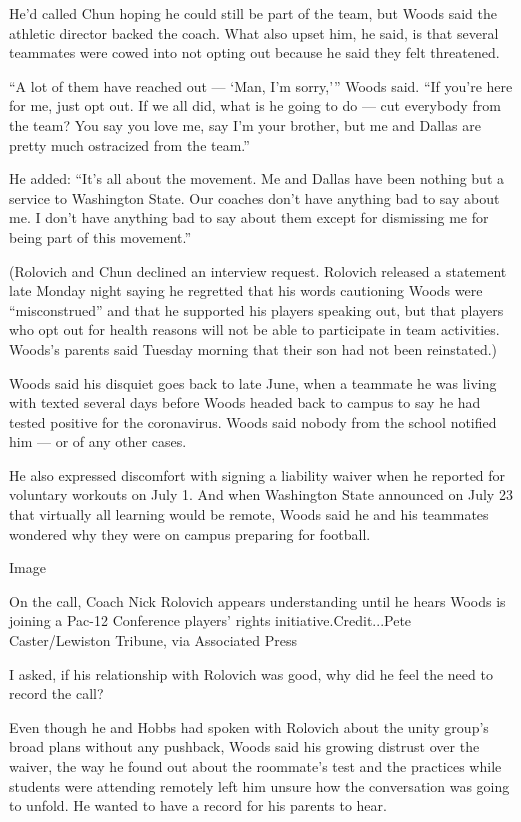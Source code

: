 He'd called Chun hoping he could still be part of the team, but Woods
said the athletic director backed the coach. What also upset him, he
said, is that several teammates were cowed into not opting out because
he said they felt threatened.

``A lot of them have reached out --- `Man, I'm sorry,''' Woods said.
``If you're here for me, just opt out. If we all did, what is he going
to do --- cut everybody from the team? You say you love me, say I'm your
brother, but me and Dallas are pretty much ostracized from the team.''

He added: ``It's all about the movement. Me and Dallas have been nothing
but a service to Washington State. Our coaches don't have anything bad
to say about me. I don't have anything bad to say about them except for
dismissing me for being part of this movement.''

(Rolovich and Chun declined an interview request. Rolovich released a
statement late Monday night saying he regretted that his words
cautioning Woods were ``misconstrued'' and that he supported his players
speaking out, but that players who opt out for health reasons will not
be able to participate in team activities. Woods's parents said Tuesday
morning that their son had not been reinstated.)

Woods said his disquiet goes back to late June, when a teammate he was
living with texted several days before Woods headed back to campus to
say he had tested positive for the coronavirus. Woods said nobody from
the school notified him --- or of any other cases.

He also expressed discomfort with signing a liability waiver when he
reported for voluntary workouts on July 1. And when Washington State
announced on July 23 that virtually all learning would be remote, Woods
said he and his teammates wondered why they were on campus preparing for
football.

Image

On the call, Coach Nick Rolovich appears understanding until he hears
Woods is joining a Pac-12 Conference players' rights
initiative.Credit...Pete Caster/Lewiston Tribune, via Associated Press

I asked, if his relationship with Rolovich was good, why did he feel the
need to record the call?

Even though he and Hobbs had spoken with Rolovich about the unity
group's broad plans without any pushback, Woods said his growing
distrust over the waiver, the way he found out about the roommate's test
and the practices while students were attending remotely left him unsure
how the conversation was going to unfold. He wanted to have a record for
his parents to hear.

